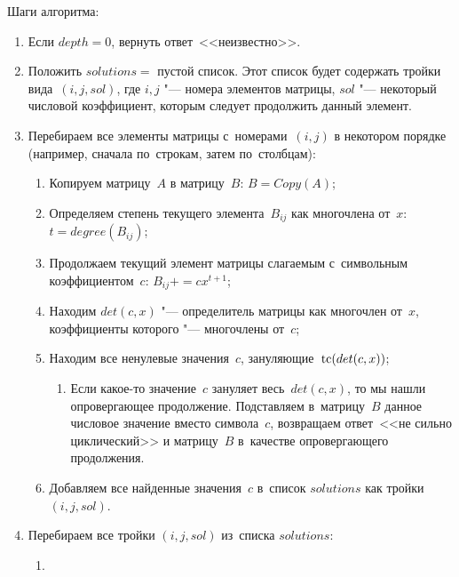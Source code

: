 Шаги алгоритма:
\begin{enumerate}
    \item
        Если $depth = 0$, вернуть ответ~<<неизвестно>>.
    \item
        Положить $solutions = $ пустой список.
        Этот список будет содержать тройки вида~$(i, j, sol)$,
        где $i, j$ "--- номера элементов матрицы, $sol$ "--- некоторый числовой коэффициент,
        которым следует продолжить данный элемент.
    \item
        Перебираем все элементы матрицы с~номерами~$(i, j)$ в некотором порядке (например, сначала по~строкам, затем по~столбцам):
        \begin{enumerate}
            \item
                Копируем матрицу~$A$ в матрицу~$B$: $B = Copy(A)$;
            \item
                Определяем степень текущего элемента~$B_{ij}$ как многочлена от~$x$:
                $t = degree(B_{ij})$;
            \item
                Продолжаем текущий элемент матрицы слагаемым с~символьным коэффициентом~$c$:
                $B_{ij} += cx^{t + 1}$;
            \item
                Находим $det(c, x)$ "--- определитель матрицы \diffMatrix[B] как многочлен от~$x$,
                коэффициенты которого "--- многочлены от~$c$;
            \item
                Находим все ненулевые значения~$c$, зануляющие~$\mathop{\rm tc}(det(c, x))$;
                \begin{enumerate}
                    \item
                        Если какое-то значение~$c$ зануляет весь~$det(c, x)$,
                        то мы нашли опровергающее продолжение.
                        Подставляем в~матрицу~$B$ данное числовое значение вместо символа~$c$,
                        возвращаем ответ~<<не сильно циклический>> и матрицу~$B$ в~качестве опровергающего продолжения.
                \end{enumerate}
            \item
                Добавляем все найденные значения~$c$ в~список $solutions$ как тройки~$(i, j, sol)$.
        \end{enumerate}
    \item
        Перебираем все тройки $(i, j, sol)$ из~списка $solutions$:
        \begin{enumerate}
            \item

\end{enumerate}
\end{enumerate}
